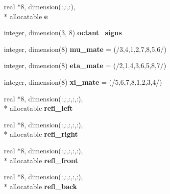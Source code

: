 \begin{DoxyCompactItemize}
\item 
\hypertarget{classsolvar_aa1e1a567ef430e8ff6f3890af88d4826}{real $\ast$8, dimension(\+:,\+:,\+:), \\*
allocatable {\bfseries e}}\label{classsolvar_aa1e1a567ef430e8ff6f3890af88d4826}

\item 
\hypertarget{classsolvar_ad8e22ecd26537a488344e0b4d5692675}{integer, dimension(3, 8) {\bfseries octant\+\_\+signs}}\label{classsolvar_ad8e22ecd26537a488344e0b4d5692675}

\item 
\hypertarget{classsolvar_ae96623c0c9a05f10c4c68858ef955476}{integer, dimension(8) {\bfseries mu\+\_\+mate} = (/3,4,1,2,7,8,5,6/)}\label{classsolvar_ae96623c0c9a05f10c4c68858ef955476}

\item 
\hypertarget{classsolvar_a0a51963d6f84ac9df3a98b2efd1099c4}{integer, dimension(8) {\bfseries eta\+\_\+mate} = (/2,1,4,3,6,5,8,7/)}\label{classsolvar_a0a51963d6f84ac9df3a98b2efd1099c4}

\item 
\hypertarget{classsolvar_aaeb65d203faa02300a49bb400e576c39}{integer, dimension(8) {\bfseries xi\+\_\+mate} = (/5,6,7,8,1,2,3,4/)}\label{classsolvar_aaeb65d203faa02300a49bb400e576c39}

\item 
\hypertarget{classsolvar_ad3a53395e3333a8e8e138cd094a3403d}{real $\ast$8, dimension(\+:,\+:,\+:,\+:,\+:), \\*
allocatable {\bfseries refl\+\_\+left}}\label{classsolvar_ad3a53395e3333a8e8e138cd094a3403d}

\item 
\hypertarget{classsolvar_aad1bed62bafbe160974cd834e8e7f77f}{real $\ast$8, dimension(\+:,\+:,\+:,\+:,\+:), \\*
allocatable {\bfseries refl\+\_\+right}}\label{classsolvar_aad1bed62bafbe160974cd834e8e7f77f}

\item 
\hypertarget{classsolvar_a8492bd105ee9f2e0829e19bd6b105a26}{real $\ast$8, dimension(\+:,\+:,\+:,\+:,\+:), \\*
allocatable {\bfseries refl\+\_\+front}}\label{classsolvar_a8492bd105ee9f2e0829e19bd6b105a26}

\item 
\hypertarget{classsolvar_ab0835a028d0ae4651e76dec71eeb8352}{real $\ast$8, dimension(\+:,\+:,\+:,\+:,\+:), \\*
allocatable {\bfseries refl\+\_\+back}}\label{classsolvar_ab0835a028d0ae4651e76dec71eeb8352}


\end{DoxyCompactItemize}
